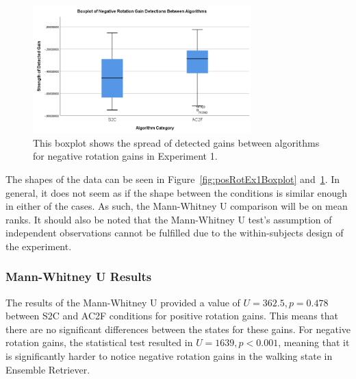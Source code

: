 \begin{figure}[tbph]
    \centering
    \includegraphics[width=0.75\textwidth]{figures/graphs/NegRotationDetectionBoxplot.png}
    \caption[Boxplot on Negative Rotation Detections in Experiment 1]{This boxplot shows the spread of detected gains between algorithms for negative rotation gains in Experiment 1.}
    \label{fig:negRotEx1Boxplot}
\end{figure}

The shapes of the data can be seen in Figure~\ref{fig:posRotEx1Boxplot} and~\ref{fig:negRotEx1Boxplot}. In general, it does not seem as if the shape between the conditions is similar enough in either of the cases. As such, the Mann-Whitney U comparison will be on mean ranks. It should also be noted that the Mann-Whitney U test's assumption of independent observations cannot be fulfilled due to the within-subjects design of the experiment.

\subsubsection{Mann-Whitney U Results}
The results of the Mann-Whitney U provided a value of $U = 362.5, p = 0.478$ between S2C and AC2F conditions for positive rotation gains. This means that there are no significant differences between the states for these gains. For negative rotation gains, the statistical test resulted in $U = 1639, p < 0.001$, meaning that it is significantly harder to notice negative rotation gains in the walking state in Ensemble Retriever.

